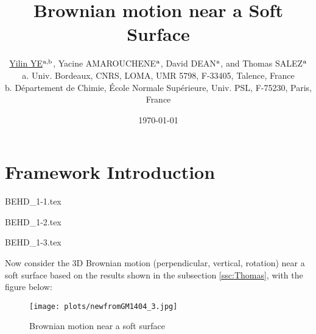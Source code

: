 \documentclass[books,12pt]{elegantpaper}
\title{\textcolor{ChimieBlue}{Brownian motion near a Soft Surface}}
\author{\href{https://yiliny.github.io/yiliny/}{Yilin YE}$^{\rm a,b}$, Yacine AMAROUCHENE$^{\rm a}$, David DEAN$^{\rm a}$, and Thomas SALEZ$^{\rm a}$ \\ \small{\rm{a.} Univ. Bordeaux, CNRS, LOMA, UMR 5798, F-33405, Talence, France} \\ \small{\rm{b.} Département de Chimie, École Normale Supérieure, Univ. PSL, F-75230, Paris, France}}
\date{\today} %
\begin{document}
\maketitle


\tableofcontents %




\newpage
\setcounter{page}{1} %



\section{Framework Introduction}

{BEHD_1-1.tex}


{BEHD_1-2.tex}


{BEHD_1-3.tex}





\newpage
{}
\label{BEHD}

Now consider the 3D Brownian motion (perpendicular, vertical, rotation) near a soft surface based on the results shown in the subsection \ref{ssc:Thomas}, with the figure below:
\begin{figure}[htbp]\centering
\texttt{[image: plots/newfromGM1404\_3.jpg]}
\caption{Brownian motion near a soft surface}
\end{figure}
\end{document}

